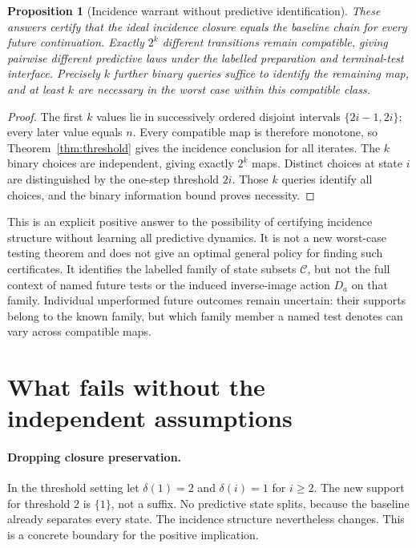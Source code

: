 \documentclass[11pt]{article}
\newtheorem{proposition}[theorem]{Proposition}
\theoremstyle{remark}
\newcommand{\C}{\mathcal C}
\begin{document}
\begin{proposition}[Incidence warrant without predictive identification]
\label{prop:uncertain}
These answers certify that the ideal incidence closure equals the baseline chain for every future continuation. Exactly $2^k$ different transitions remain compatible, giving pairwise different predictive laws under the labelled preparation and terminal-test interface. Precisely $k$ further binary queries suffice to identify the remaining map, and at least $k$ are necessary in the worst case within this compatible class.
\end{proposition}
\begin{proof}
The first $k$ values lie in successively ordered disjoint intervals $\{2i-1,2i\}$; every later value equals $n$. Every compatible map is therefore monotone, so Theorem~\ref{thm:threshold} gives the incidence conclusion for all iterates. The $k$ binary choices are independent, giving exactly $2^k$ maps. Distinct choices at state $i$ are distinguished by the one-step threshold $2i$. Those $k$ queries identify all choices, and the binary information bound proves necessity.
\end{proof}

This is an explicit positive answer to the possibility of certifying incidence structure without learning all predictive dynamics. It is not a new worst-case testing theorem and does not give an optimal general policy for finding such certificates. It identifies the labelled family of state subsets $\C$, but not the full context of named future tests or the induced inverse-image action $D_a$ on that family. Individual unperformed future outcomes remain uncertain: their supports belong to the known family, but which family member a named test denotes can vary across compatible maps.

\section{What fails without the independent assumptions}
\label{sec:counterexamples}

\paragraph{Dropping closure preservation.}
In the threshold setting let $\delta(1)=2$ and $\delta(i)=1$ for $i\ge2$. The new support for threshold $2$ is $\{1\}$, not a suffix. No predictive state splits, because the baseline already separates every state. The incidence structure nevertheless changes. This is a concrete boundary for the positive implication.
\end{document}
